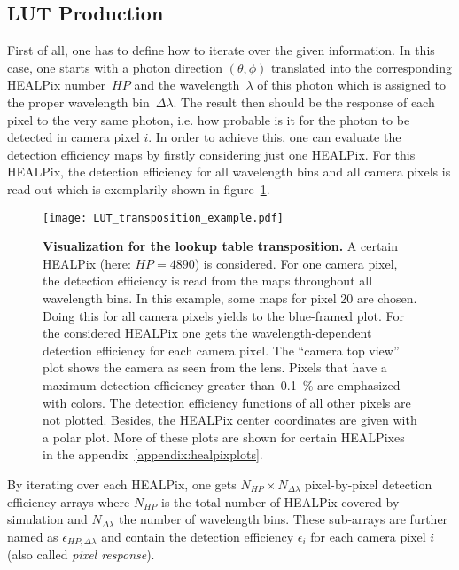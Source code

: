 \subsection{LUT Production}\label{sec:lut_production}

First of all, one has to define how to iterate over the given information. In this case, one starts with a photon direction $(\theta,\phi)$ translated into the corresponding HEALPix number~$HP$ and the wavelength~$\lambda$ of this photon which is assigned to the proper wavelength bin~$\Delta\lambda$. The result then should be the response of each pixel to the very same photon, i.e. how probable is it for the photon to be detected in camera pixel $i$. In order to achieve this, one can evaluate the detection efficiency maps by firstly considering just one HEALPix. For this HEALPix, the detection efficiency for all wavelength bins and all camera pixels is read out which is exemplarily shown in figure~\ref{lut:transpose_example}.\\

\begin{figure}[H]
	\texttt{[image: LUT\_transposition\_example.pdf]}
	\caption[Visualization for the lookup table transposition]{\textbf{Visualization for the lookup table transposition.} A certain HEALPix (here: $HP=\num{4890}$) is considered. For one camera pixel, the detection efficiency is read from the maps throughout all wavelength bins. In this example, some maps for pixel \num{20} are chosen. Doing this for all camera pixels yields to the blue-framed plot. For the considered HEALPix one gets the wavelength-dependent detection efficiency for each camera pixel. The \enquote{camera top view} plot shows the camera as seen from the lens. Pixels that have a maximum detection efficiency greater than~\SI{0.1}{\percent} are emphasized with colors. The detection efficiency functions of all other pixels are not plotted. Besides, the HEALPix center coordinates are given with a polar plot. More of these plots are shown for certain HEALPixes in the appendix~\ref{appendix:healpixplots}.}
	\label{lut:transpose_example}
\end{figure}

By iterating over each HEALPix, one gets $N_{HP}\times N_{\Delta\lambda}$ pixel-by-pixel detection efficiency arrays where $N_{HP}$ is the total number of HEALPix covered by simulation and $N_{\Delta\lambda}$ the number of wavelength bins. These sub-arrays are further named as $\epsilon_{HP,\Delta\lambda}$ and contain the detection efficiency $\epsilon_i$ for each camera pixel $i$ (also called \textit{pixel response}). 

